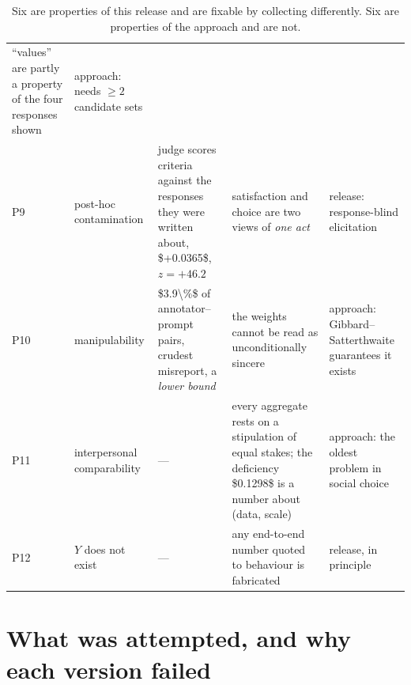 \begin{table}[H]
\begin{tabularx}{\textwidth}{P{0.7cm}P{3.4cm}P{3.0cm}P{4.0cm}Y}
``values'' are partly a property of the four responses shown & approach: needs
$\ge2$ candidate sets\\
P9 & post-hoc contamination & judge scores criteria against the responses they
were written about, \num{$+0.0365$}, $z=+46.2$ & satisfaction and choice are two
views of \emph{one act} & release: response-blind elicitation\\
P10 & manipulability & \num{$3.9\%$} of annotator--prompt pairs, crudest
misreport, a \emph{lower bound} & the weights cannot be read as unconditionally
sincere & approach: Gibbard--Satterthwaite guarantees it exists\\
P11 & interpersonal comparability & --- & every aggregate rests on a stipulation
of equal stakes; the deficiency \num{$0.1298$} is a number about (data, scale) &
approach: the oldest problem in social choice\\
P12 & $Y$ does not exist & --- & any end-to-end number quoted to behaviour is
fabricated & release, in principle\\
\bottomrule
\end{tabularx}
\caption{Six are properties of this release and are fixable by collecting
differently. Six are properties of the approach and are not.}
\label{tab:problems}
\end{table}

\section{What was attempted, and why each version failed}
\label{sec:attempts}


